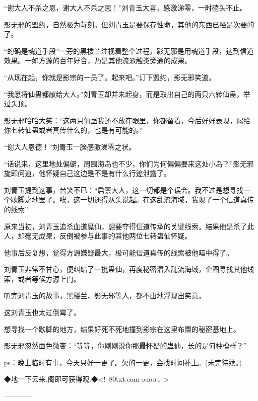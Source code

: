 \begin{this_body}
“谢大人不杀之恩，谢大人不杀之恩！”刘青玉大喜，感激涕零，一时磕头不止。

影无邪的盟约，自然极为苛刻。但刘青玉是要保存性命，其他的东西已经是次要的了。

“的确是魂道手段”一旁的黑楼兰注视着整个过程，影无邪是用魂道手段，达到信道效果。一如方源的百年好合，乃是其他流派触类旁通的成果。

“从现在起，你就是影宗的一员了。起来吧。”订下盟约，影无邪笑道。

“我愿将仙蛊都献给大人。”刘青玉却并未起身，而是取出自己的两只六转仙蛊，举过头顶。

影无邪哈哈大笑：“这两只仙蛊我还不放在眼里，你都留着，今后好好表现，赐给你七转仙蛊或者真传什么的，也是有可能的。”

“谢大人恩德！”刘青玉一脸感激涕零之状。

“话说来，这里地处偏僻，周围海岛也不少，你们为何偏偏要来这处小岛？”影无邪旋即问道，他怀疑自己这边是不是有什么行迹泄露了。

刘青玉提到这事，苦笑不已：“启禀大人，这一切都是个误会。我不过是想寻找一个歇脚之地罢了。唉，这一切还得从头说起。在这乱流海域，我现了一个信道真传的线索”

原来当初，刘青玉追杀血道魔仙，想要夺得信道传承的关键线索。结果他是杀了此人，却毫无成果，反倒被参与此事的其他两位七转蛊仙怀疑。

他事后反复想，觉得方源嫌疑最大，极可能信道真传的线索被他暗中得了。

刘青玉非常不甘心，便纠结了一批蛊仙，再度秘密潜入乱流海域，企图寻找其他线索，或者等候方源上门。

听完刘青玉的故事，黑楼兰、影无邪等人，都不由地浮现出笑意。

这刘青玉也太过倒霉了。

想寻找一个歇脚的地方，结果好死不死地撞到影宗在这里布置的秘密基地上。

影无邪忽然面色微变：“等等，你刚刚说你那最怀疑的蛊仙，长的是何种模样？”

ps：晚上临时有事，今天只好一更了。欠的一更，会找时间补上。(未完待续。)

◆地一下云来.阁即可获得观.◆<!--80txt.com-ouoou-->

------------

\end{this_body}

